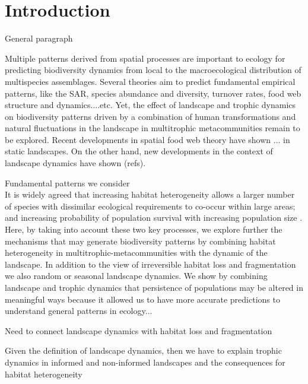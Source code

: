 \section{Introduction}

\vspace{0.2 in}
General paragraph
\vspace{0.2 in}

Multiple patterns derived from spatial processes are important to
ecology for predicting biodiversity dynamics from local to the
macroecological distribution of multispecies assemblages. Several
theories aim to predict fundamental empirical patterns, like the SAR,
species abundance and diversity, turnover rates, food web structure
and dynamics....etc. Yet, the effect of landscape and trophic dynamics
on biodiversity patterns driven by a combination of human
transformations and natural fluctuations in the landscape in
multitrophic metacommunities remain to be explored. Recent
developments in spatial food web theory have shown
\cite{haegemanLoreau2014}... in static landscapes. On the other hand,
new developments in the context of landscape dynamics have shown
(refs).

\vspace{0.2 in}
Fundamental patterns we consider \\
\vspace{0.05 in}
It is widely agreed that increasing habitat heterogeneity allows a
larger number of species with dissimilar ecological requirements to
co-occur within large areas; and increasing probability of population
survival with increasing population size \cite{whittaker2008}. Here,
by taking into account these two key processes, we explore further the
mechanisms that may generate biodiversity patterns by combining
habitat heterogeneity in multitrophic-metacommunities with the dynamic
of the landscape. In addition to the view of irreversible habitat loss
and fragmentation we also random or seasonal landscape dynamics. We
show by combining landscape and trophic dynamics that persistence of
populations may be altered in meaningful ways because it allowed us to
have more accurate predictions to understand general patterns in
ecology...

\vspace{0.2 in}
Need to connect landscape dynamics with habitat loss and fragmentation\\
\vspace{0.2 in}

Given the definition of landscape dynamics, then we have to explain
trophic dynamics in informed and non-informed landscapes 
and the consequences for habitat heterogeneity\\
\vspace{0.2 in}

